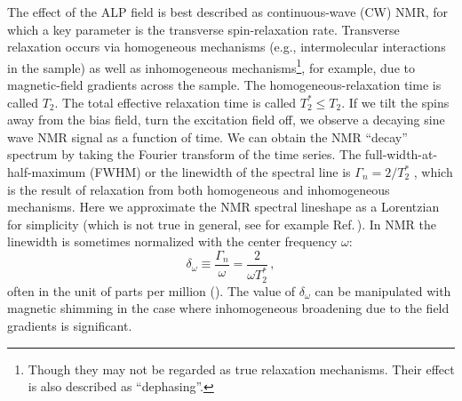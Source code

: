 \documentclass{WileyMSP-template}
\newcommand{\DK}[1]{\textcolor{brown}{Derek: #1}}
\newcommand{\AW}[1]{\textcolor{cyan}{Arne: #1}}
\begin{document}
	The effect of the ALP field is best described as continuous-wave (CW) NMR, for which a key parameter is the transverse spin-relaxation rate. 
	Transverse relaxation occurs via homogeneous mechanisms (e.g., intermolecular interactions in the sample) as well as inhomogeneous mechanisms\footnote{Though they may not be regarded as true relaxation mechanisms. Their effect is also described as ``dephasing''. }, for example, due to magnetic-field gradients across the sample. 
	The homogeneous-relaxation time is called $T_2$. 
	The total effective relaxation time is called $T_2^*\leq T_2$.
	If we tilt the spins away from the bias field, turn the excitation field off, we observe a decaying sine wave NMR signal as a function of time. We can obtain the NMR ``decay'' spectrum by taking the Fourier transform of the time series. 
	The full-width-at-half-maximum (FWHM) or the linewidth of the spectral line is $\Gamma_{n} = 2/T_2^*$ \cite{Levitt2008SpinDynamics}, which is the result of relaxation from both homogeneous and inhomogeneous mechanisms. Here we approximate the NMR spectral lineshape as a Lorentzian for simplicity (which is not true in general, see for example Ref.\,\cite{Aybas_2021_Solid-StateNMR}).
	In NMR the linewidth is sometimes normalized with the center frequency $\omega$:
	\begin{equation}
		\delta_\omega \equiv \dfrac{\Gamma_{n}}{\omega} = \dfrac{2}{\omega T_2^*}
		\,,\label{eq:delta_omega}
	\end{equation}
	often in the unit of parts per million (\SI{}{\ppm}). The value of $\delta_{\omega}$ can be manipulated with magnetic shimming in the case where inhomogeneous broadening due to the field gradients is significant. 
\end{document}

